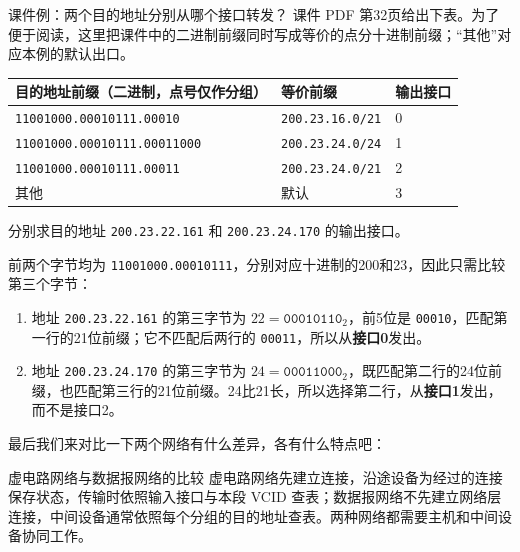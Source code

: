 \begin{example}{课件例：两个目的地址分别从哪个接口转发？}
课件 PDF 第32页给出下表。为了便于阅读，这里把课件中的二进制前缀同时写成等价的点分十进制前缀；“其他”对应本例的默认出口。
\begin{center}\small\setlength{\tabcolsep}{4pt}
\begin{tabular}{lll}\toprule
目的地址前缀（二进制，点号仅作分组） & 等价前缀 & 输出接口\\\midrule
\texttt{11001000.00010111.00010} & \texttt{200.23.16.0/21} & 0\\
\texttt{11001000.00010111.00011000} & \texttt{200.23.24.0/24} & 1\\
\texttt{11001000.00010111.00011} & \texttt{200.23.24.0/21} & 2\\
其他 & 默认 & 3\\\bottomrule\end{tabular}\end{center}
分别求目的地址 \texttt{200.23.22.161} 和 \texttt{200.23.24.170} 的输出接口。
\end{example}
\begin{solution}
前两个字节均为 \texttt{11001000.00010111}，分别对应十进制的200和23，因此只需比较第三个字节：
\begin{enumerate}[nosep]
  \item 地址 \texttt{200.23.22.161} 的第三字节为 $22=\texttt{00010110}_2$，前5位是 \texttt{00010}，匹配第一行的21位前缀；它不匹配后两行的 \texttt{00011}，所以从\textbf{接口0}发出。
  \item 地址 \texttt{200.23.24.170} 的第三字节为 $24=\texttt{00011000}_2$，既匹配第二行的24位前缀，也匹配第三行的21位前缀。24比21长，所以选择第二行，从\textbf{接口1}发出，而不是接口2。
\end{enumerate}
\end{solution}

最后我们来对比一下两个网络有什么差异，各有什么特点吧：

\begin{proposition}{虚电路网络与数据报网络的比较}
虚电路网络先建立连接，沿途设备为经过的连接保存状态，传输时依照输入接口与本段 VCID 查表；数据报网络不先建立网络层连接，中间设备通常依照每个分组的目的地址查表。两种网络都需要主机和中间设备协同工作。
\end{proposition}


